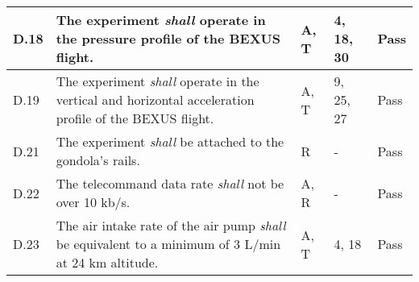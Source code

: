 \begin{longtable}[]{|m{}| m{} |m{} |m{}|m{}|}
\\ \hline %
D.18 & The  experiment \textit{shall} operate  in  the  pressure  profile  of  the BEXUS flight.\cite{BexusManual}                                                                              &    A, T         & 4, 18, 30 &  Pass
\\ \hline
D.19 & The  experiment \textit{shall} operate  in  the  vertical  and  horizontal  acceleration  profile  of  the BEXUS flight.\cite{BexusManual}                                                                              &    A, T         & 9, 25, 27            &   Pass   
\\ \hline
D.21 & The experiment \textit{shall} be attached to the gondola’s rails.                                                                                &     R         & -            &  Pass
\\ \hline %
D.22 & The telecommand data rate \textit{shall} not be over 10 kb/s.                                                                               &     A, R         & -            &    Pass
\\  \hline%

D.23 & The air intake rate of the air pump \textit{shall} be equivalent to a minimum of 3 L/min at 24 km altitude.                                                                                                                        &       A, T        & 4, 18            &  Pass      \\ \hline


\end{longtable}
